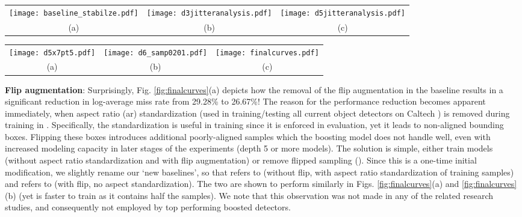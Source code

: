 \documentclass[a4paper,conference]{IEEEtran_icpr}
\begin{document}
  

\begin{figure*}[!t]
\centering
\begin{tabular}{ccc}
\texttt{[image: baseline\_stabilze.pdf]}
&
\texttt{[image: d3jitteranalysis.pdf]}
&
\texttt{[image: d5jitteranalysis.pdf]}
\\
(a) & (b) & (c)
 \end{tabular}
 \caption{Experimental analysis of different training settings on Caltech pedestrians using Caltech. }
 \label{fig:finalcurves}
\end{figure*}

\begin{figure*}[!t]
\centering
\begin{tabular}{ccc}
\texttt{[image: d5x7pt5.pdf]}
&
\texttt{[image: d6\_samp0201.pdf]}
&
\texttt{[image: finalcurves.pdf]}
\\
(a) & (b) & (c)
   \end{tabular}
 \caption{Experimental analysis of different training settings on Caltech pedestrians using additional video augmentation (Caltech unless stated).}
 \label{fig:finalcurves_caltech10}
\end{figure*}



\textbf{Flip augmentation}: Surprisingly, Fig. \ref{fig:finalcurves}(a) depicts how the removal of the flip augmentation in the  baseline results in a significant reduction in log-average miss rate from 29.28\% to 26.67\%! The reason for the performance reduction becomes apparent immediately, when aspect ratio (ar) standardization (used in training/testing all current object detectors on Caltech \cite{dollar2012pedestrian}) is removed during training in . Specifically, the standardization is useful in training since it is enforced in evaluation, yet it leads to non-aligned bounding boxes. Flipping these boxes introduces additional poorly-aligned samples which the boosting model does not handle well, even with increased modeling capacity in later stages of the experiments (depth 5 or more models). The solution is simple, either train  models (without aspect ratio standardization and with flip augmentation) or remove flipped sampling (). Since this is a one-time initial modification, we slightly rename our `new baselines', so that  refers to  (without flip, with aspect ratio standardization of training samples) and  refers to  (with flip, no aspect standardization). The two are shown to perform similarly in Figs. \ref{fig:finalcurves}(a) and \ref{fig:finalcurves}(b) (yet  is faster to train as it contains half the samples). We note that this observation was not made in any of the related research studies, and consequently not employed by top performing boosted detectors.  
\end{document}
